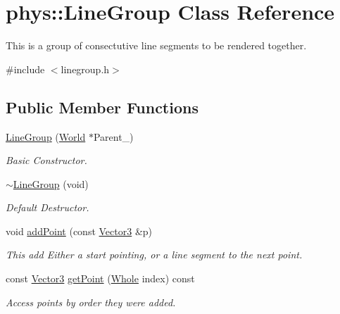 \hypertarget{classphys_1_1LineGroup}{
\section{phys::LineGroup Class Reference}
\label{db/ddb/classphys_1_1LineGroup}
}


This is a group of consectutive line segments to be rendered together.  




{\ttfamily \#include $<$linegroup.h$>$}

\subsection*{Public Member Functions}
\begin{DoxyCompactItemize}
\item 
\hyperlink{classphys_1_1LineGroup_a676039a6beec56d24c631e9da5fd7e76}{LineGroup} (\hyperlink{classphys_1_1World}{World} $\ast$Parent\_\-)
\begin{DoxyCompactList}\small\item\em Basic Constructor. \item\end{DoxyCompactList}\item 
\hyperlink{classphys_1_1LineGroup_a0ddd66bc946dd266e3b666c8101ea7f8}{$\sim$LineGroup} (void)
\begin{DoxyCompactList}\small\item\em Default Destructor. \item\end{DoxyCompactList}\item 
void \hyperlink{classphys_1_1LineGroup_a042a8facc505866f619cfc043a820f03}{addPoint} (const \hyperlink{classphys_1_1Vector3}{Vector3} \&p)
\begin{DoxyCompactList}\small\item\em This add Either a start pointing, or a line segment to the next point. \item\end{DoxyCompactList}\item 
const \hyperlink{classphys_1_1Vector3}{Vector3} \hyperlink{classphys_1_1LineGroup_a960e1ceba7e9804b7906f8618f869202}{getPoint} (\hyperlink{namespacephys_a460f6bc24c8dd347b05e0366ae34f34a}{Whole} index) const 
\begin{DoxyCompactList}\small\item\em Access points by order they were added. \item\end{DoxyCompactList}\item 

\end{DoxyCompactItemize}
